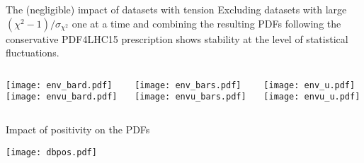 \begin{frame}{The (negligible) impact of datasets with tension}
    Excluding datasets with large $({\chi^{2}-1})/{\sigma_{\chi^{2}}}$ one at a time and combining the resulting PDFs following the conservative PDF4LHC15 prescription shows stability at the level of statistical fluctuations.
    \begin{columns}
        \begin{column}[T]{0.32\textwidth}
            \centering
            \texttt{[image: env\_bard.pdf]}\\
            \texttt{[image: envu\_bard.pdf]}
        \end{column}
        \begin{column}[T]{0.32\textwidth}
            \centering
            \texttt{[image: env\_bars.pdf]}\\
            \texttt{[image: envu\_bars.pdf]}
        \end{column}
        \begin{column}[T]{0.32\textwidth}
            \centering
            \texttt{[image: env\_u.pdf]}\\
            \texttt{[image: envu\_u.pdf]}
        \end{column}
    \end{columns}
\end{frame}

\begin{frame}[t]{Impact of positivity on the PDFs}
    \begin{center}
        \texttt{[image: dbpos.pdf]}
    \end{center}
\end{frame}


